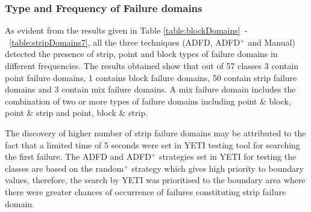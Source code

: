 







\subsubsection{Type and Frequency of Failure domains}

As evident from the results given in Table \ref{table:blockDomains}~-~\ref{table:stripDomains7}, all the three techniques (ADFD, ADFD$^+$ and Manual) detected the presence of strip, point and block types of failure domains in different frequencies. The results obtained show that out of 57 classes 3 contain point failure domains, 1 contains block failure domains, 50 contain strip failure domains and 3 contain mix failure domains. A mix failure domain includes the combination of two or more types of failure domains including point \& block, point \& strip and point, block \& strip.


The discovery of higher number of strip failure domains may be attributed to the fact that a limited time of 5 seconds were set in YETI testing tool for searching the first failure. The ADFD and ADFD$^+$ strategies set in YETI for testing the classes are based on the random$^+$ strategy which gives high priority to boundary values, therefore, the search by YETI was prioritised to the boundary area where there were greater chances of occurrence of failures constituting strip failure domain.

